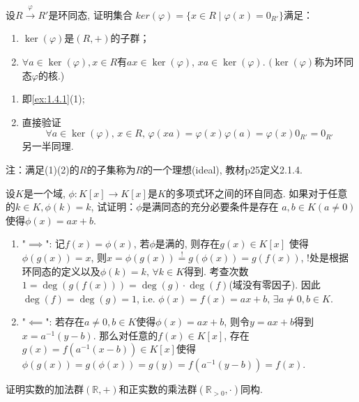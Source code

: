 \begin{problem}
    设$R \overset{\varphi}\to R'$是环同态, 证明集合
$ker(\varphi) = \{x \in R \mid \varphi(x) = 0_{R'}\}$满足：
\begin{enumerate}[(1)]
    \item $\ker(\varphi)$是$(R, +)$的子群；
    \item $\forall a \in \ker (\varphi), x \in R$有$ax \in \ker(\varphi)$, $xa \in \ker (\varphi)$.
$(\ker(\varphi)$称为环同态$\varphi$的核.)
\end{enumerate}
\end{problem}

\begin{solution}
\begin{enumerate}[(1)]
    \item 即\ref{ex:1.4.1}(1);
    \item 直接验证\[
        \forall a \in \ker(\varphi),\, x \in R,\, \varphi(xa) = \varphi(x)\varphi(a) = \varphi(x)0_{R'} = 0_{R'}
    \]
    另一半同理.
\end{enumerate}
注：满足(1)(2)的$R$的子集称为$R$的一个理想(ideal), 教材p25定义2.1.4.
\end{solution}

\begin{problem}
    设$K$是一个域, $\phi:K[x] \to K[x]$是$K$的多项式环之间的环自同态. 
如果对于任意的$k \in K, \phi(k) = k$, 试证明：$\phi$是满同态的充分必要条件是存在
$a, b \in K(a \neq 0)$使得$\phi(x) = ax + b$.
\end{problem}

\begin{solution}
\begin{enumerate}[(1)]
    \item "$\implies$": 记$f(x) = \phi(x)$, 若$\phi$是满的, 则存在$g(x) \in K[x]$
使得$\phi(g(x)) = x$, 则$x = \phi(g(x)) \overset{!}= g(\phi(x)) = g(f(x))$,
!处是根据环同态的定义以及$\phi(k) = k,\, \forall k \in K$得到.
考查次数$1 = \deg(g(f(x))) = \deg(g) \cdot \deg(f)$(域没有零因子). 因此$\deg(f) = \deg(g) = 1$,
i.e. $\phi(x) = f(x) = ax + b,\, \exists a \neq 0, b \in K$.
    \item "$\impliedby$": 若存在$a \neq 0, b \in K$使得$\phi(x) = ax + b$,
则令$y = ax + b$得到$x = a^{-1}(y - b)$. 那么对任意的$f(x) \in K[x]$,
存在$g(x) = f(a^{-1}(x - b)) \in K[x]$使得$\phi(g(x)) = g(\phi(x)) = g(y) = f(a^{-1}(y - b)) = f(x)$.
\end{enumerate}
\end{solution}

\begin{problem}
    证明实数的加法群$(\mathbb{R}, +)$和正实数的乘法群$(\mathbb{R}_{>0}, \cdot)$同构.
\end{problem}

